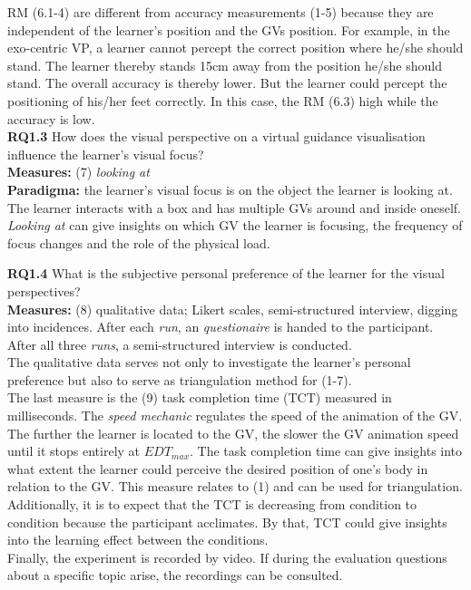 RM (6.1-4) are different from accuracy measurements (1-5) because they are independent of the learner's position and the GVs position. For example, in the exo-centric VP, a learner cannot percept the correct position where he/she should stand. The learner thereby stands 15cm away from the position he/she should stand. The overall accuracy is thereby lower. But the learner could percept the positioning of his/her feet correctly. In this case, the RM (6.3) high while the accuracy is low.\\

\textbf{RQ1.3} How does the visual perspective on a virtual guidance visualisation influence the learner's visual focus?\\
\textbf{Measures:} (7) \textit{looking at}\\
\textbf{Paradigma:} the learner's visual focus is on the object the learner is looking at.\\
The learner interacts with a box and has multiple GVs around and inside oneself. \textit{Looking at} can give insights on which GV the learner is focusing, the frequency of focus changes and the role of the physical load.

\textbf{RQ1.4} What is the subjective personal preference of the learner for the visual perspectives?\\
\textbf{Measures:} (8) qualitative data; Likert scales, semi-structured interview, digging into incidences. After each \textit{run}, an \textit{questionaire} is handed to the participant. After all three \textit{runs}, a semi-structured interview is conducted.\\
The qualitative data serves not only to investigate the learner's personal preference but also to serve as triangulation method for (1-7).\\

The last measure is the (9) task completion time (TCT) measured in milliseconds. The \textit{speed mechanic} regulates the speed of the animation of the GV. The further the learner is located to the GV, the slower the GV animation speed until it stops entirely at $EDT_{max}$. The task completion time can give insights into what extent the learner could perceive the desired position of one's body in relation to the GV. This measure relates to (1) and can be used for triangulation.
Additionally, it is to expect that the TCT is decreasing from condition to condition because the participant acclimates. By that, TCT could give insights into the learning effect between the conditions.\\
Finally, the experiment is recorded by video. If during the evaluation questions about a specific topic arise, the recordings can be consulted.

